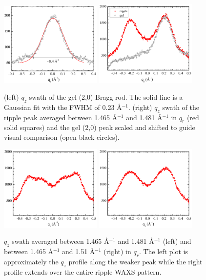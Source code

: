 \begin{figure}[htbp]
  \centering
  \includegraphics[width=0.45\textwidth]{figures/ripple/tWAXS/twaxs_gel_qz}
  \includegraphics[width=0.45\textwidth]{figures/ripple/tWAXS/twaxs_strong_qz}
  \caption[]{(left) $q_z$ swath of the gel (2,0) Bragg rod. The solid line is
  a Gaussian fit with the FWHM of 0.23 \AA$^{-1}$. 
  (right) $q_z$ swath of the ripple peak averaged between 1.465 \AA$^{-1}$ and 1.481 \AA$^{-1}$
   in $q_r$ (red solid squares) and the gel (2,0) peak scaled and shifted to guide 
   visual comparison (open black circles).}
  \label{fig:twaxs_gel_qz}
\end{figure}

\begin{figure}[htbp]
  \centering
  \includegraphics[width=0.45\textwidth]{figures/ripple/tWAXS/twaxs_weak_qz}
  \includegraphics[width=0.45\textwidth]{figures/ripple/tWAXS/twaxs_both_qz}
  \caption{$q_z$ swath averaged between 1.465 \AA$^{-1}$ and 1.481 \AA$^{-1}$
  (left) and between 1.465 \AA$^{-1}$ and 1.51 \AA$^{-1}$ (right) in $q_r$.
  The left plot is approximately the $q_z$ profile along the weaker peak
  while the right profile extends over the entire ripple WAXS pattern.}
  \label{fig:twaxs_qzplot}
\end{figure}  

